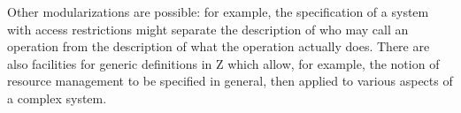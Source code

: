 \documentclass{llncs}
\begin{document}
Other modularizations are possible: for example, the
specification of a system with access restrictions might separate the
description of who may call an operation from the description of what
the operation actually does.
There are also facilities for generic definitions in Z which allow, for
example, the notion of resource management to be specified in general,
then applied to various aspects of a complex system.
\end{document}
